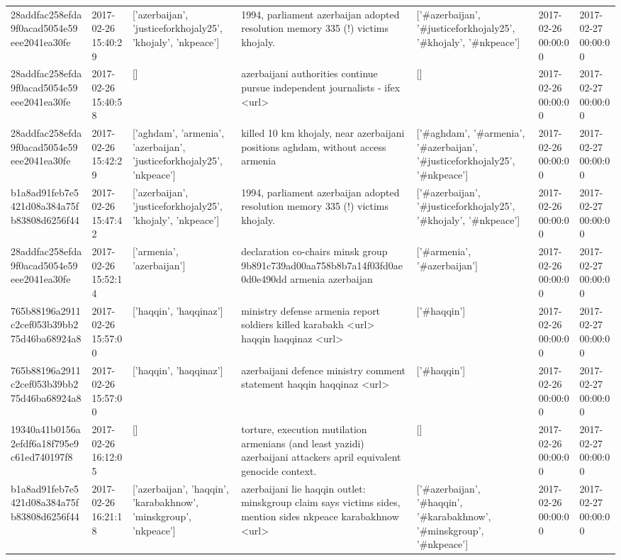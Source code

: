 \begin{tabular}{lllllll}
28addfac258efda9f0acad5054e59eee2041ea30fe & 2017-02-26 15:40:29 & ['azerbaijan', 'justiceforkhojaly25', 'khojaly', 'nkpeace'] & 1994, parliament azerbaijan adopted resolution memory 335 (!) victims khojaly. & ['#azerbaijan', '#justiceforkhojaly25', '#khojaly', '#nkpeace'] & 2017-02-26 00:00:00 & 2017-02-27 00:00:00 \\
28addfac258efda9f0acad5054e59eee2041ea30fe & 2017-02-26 15:40:58 & [] & azerbaijani authorities continue pursue independent journalists - ifex <url> & [] & 2017-02-26 00:00:00 & 2017-02-27 00:00:00 \\
28addfac258efda9f0acad5054e59eee2041ea30fe & 2017-02-26 15:42:29 & ['aghdam', 'armenia', 'azerbaijan', 'justiceforkhojaly25', 'nkpeace'] & killed 10 km khojaly, near azerbaijani positions aghdam, without access armenia & ['#aghdam', '#armenia', '#azerbaijan', '#justiceforkhojaly25', '#nkpeace'] & 2017-02-26 00:00:00 & 2017-02-27 00:00:00 \\
b1a8ad91feb7e5421d08a384a75fb83808d6256f44 & 2017-02-26 15:47:42 & ['azerbaijan', 'justiceforkhojaly25', 'khojaly', 'nkpeace'] & 1994, parliament azerbaijan adopted resolution memory 335 (!) victims khojaly. & ['#azerbaijan', '#justiceforkhojaly25', '#khojaly', '#nkpeace'] & 2017-02-26 00:00:00 & 2017-02-27 00:00:00 \\
28addfac258efda9f0acad5054e59eee2041ea30fe & 2017-02-26 15:52:14 & ['armenia', 'azerbaijan'] & declaration co-chairs minsk group 9b891c739ad00aa758b8b7a14f03fd0ae0d0e490dd armenia azerbaijan & ['#armenia', '#azerbaijan'] & 2017-02-26 00:00:00 & 2017-02-27 00:00:00 \\
765b88196a2911c2cef053b39bb275d46ba68924a8 & 2017-02-26 15:57:00 & ['haqqin', 'haqqinaz'] & ministry defense armenia report soldiers killed karabakh <url> haqqin haqqinaz <url> & ['#haqqin'] & 2017-02-26 00:00:00 & 2017-02-27 00:00:00 \\
765b88196a2911c2cef053b39bb275d46ba68924a8 & 2017-02-26 15:57:00 & ['haqqin', 'haqqinaz'] & azerbaijani defence ministry comment statement haqqin haqqinaz <url> & ['#haqqin'] & 2017-02-26 00:00:00 & 2017-02-27 00:00:00 \\
19340a41b0156a2efdf6a18f795e9c61ed740197f8 & 2017-02-26 16:12:05 & [] & torture, execution mutilation armenians (and least yazidi) azerbaijani attackers april equivalent genocide context. & [] & 2017-02-26 00:00:00 & 2017-02-27 00:00:00 \\
b1a8ad91feb7e5421d08a384a75fb83808d6256f44 & 2017-02-26 16:21:18 & ['azerbaijan', 'haqqin', 'karabakhnow', 'minskgroup', 'nkpeace'] & azerbaijani lie haqqin outlet: minskgroup claim says victims sides, mention sides nkpeace karabakhnow <url> & ['#azerbaijan', '#haqqin', '#karabakhnow', '#minskgroup', '#nkpeace'] & 2017-02-26 00:00:00 & 2017-02-27 00:00:00 \\

\end{tabular}
